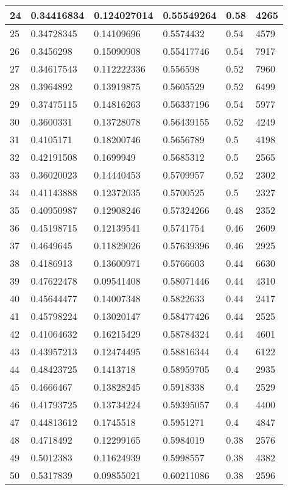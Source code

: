 \begin{longtable}{|l|l|l|l|l|l|}
24 & 0.34416834 & 0.124027014 & 0.55549264 & 0.58 & 4265 \\ \hline 
25 & 0.34728345 & 0.14109696 & 0.5574432 & 0.54 & 4579 \\ \hline 
26 & 0.3456298 & 0.15090908 & 0.55417746 & 0.54 & 7917 \\ \hline 
27 & 0.34617543 & 0.112222336 & 0.556598 & 0.52 & 7960 \\ \hline 
28 & 0.3964892 & 0.13919875 & 0.5605529 & 0.52 & 6499 \\ \hline 
29 & 0.37475115 & 0.14816263 & 0.56337196 & 0.54 & 5977 \\ \hline 
30 & 0.3600331 & 0.13728078 & 0.56439155 & 0.52 & 4249 \\ \hline 
31 & 0.4105171 & 0.18200746 & 0.5656789 & 0.5 & 4198 \\ \hline 
32 & 0.42191508 & 0.1699949 & 0.5685312 & 0.5 & 2565 \\ \hline 
33 & 0.36020023 & 0.14440453 & 0.5709957 & 0.52 & 2302 \\ \hline 
34 & 0.41143888 & 0.12372035 & 0.5700525 & 0.5 & 2327 \\ \hline 
35 & 0.40950987 & 0.12908246 & 0.57324266 & 0.48 & 2352 \\ \hline 
36 & 0.45198715 & 0.12139541 & 0.5741754 & 0.46 & 2609 \\ \hline 
37 & 0.4649645 & 0.11829026 & 0.57639396 & 0.46 & 2925 \\ \hline 
38 & 0.4186913 & 0.13600971 & 0.5766603 & 0.44 & 6630 \\ \hline 
39 & 0.47622478 & 0.09541408 & 0.58071446 & 0.44 & 4310 \\ \hline 
40 & 0.45644477 & 0.14007348 & 0.5822633 & 0.44 & 2417 \\ \hline 
41 & 0.45798224 & 0.13020147 & 0.58477426 & 0.44 & 2525 \\ \hline 
42 & 0.41064632 & 0.16215429 & 0.58784324 & 0.44 & 4601 \\ \hline 
43 & 0.43957213 & 0.12474495 & 0.58816344 & 0.4 & 6122 \\ \hline 
44 & 0.48423725 & 0.1413718 & 0.58959705 & 0.4 & 2935 \\ \hline 
45 & 0.4666467 & 0.13828245 & 0.5918338 & 0.4 & 2529 \\ \hline 
46 & 0.41793725 & 0.13734224 & 0.59395057 & 0.4 & 4400 \\ \hline 
47 & 0.44813612 & 0.1745518 & 0.5951271 & 0.4 & 4847 \\ \hline 
48 & 0.4718492 & 0.12299165 & 0.5984019 & 0.38 & 2576 \\ \hline 
49 & 0.5012383 & 0.11624939 & 0.5998557 & 0.38 & 4382 \\ \hline 
50 & 0.5317839 & 0.09855021 & 0.60211086 & 0.38 & 2596 \\ \hline 
\end{longtable}